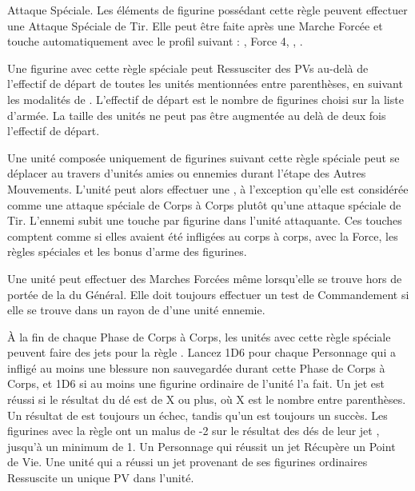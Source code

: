 \armyspecialruleentry{\wailofwoe}

Attaque Spéciale. Les éléments de figurine possédant cette règle peuvent effectuer une Attaque Spéciale de Tir. Elle peut être faite après une Marche Forcée et touche automatiquement avec le profil suivant : , Force 4, \magicalattacks{}, .



Une figurine avec cette règle spéciale peut Ressusciter des PVs au-delà de l'effectif de départ de toutes les unités mentionnées entre parenthèses, en suivant les modalités de \raisewounds{}. L'effectif de départ est le nombre de figurines choisi sur la liste d'armée. La taille des unités ne peut pas être augmentée au delà de deux fois l'effectif de départ.


\armyspecialruleentry{\reaper}

Une unité composée uniquement de figurines suivant cette règle spéciale peut se déplacer au travers d'unités amies ou ennemies durant l'étape des Autres Mouvements. L'unité peut alors effectuer une \sweepingattack{}, à l'exception qu'elle est considérée comme une attaque spéciale de Corps à Corps plutôt qu'une attaque spéciale de Tir. L'ennemi subit une touche par figurine dans l'unité attaquante. Ces touches comptent comme si elles avaient été infligées au corps à corps, avec la Force, les règles spéciales et les bonus d'arme des figurines.


Une unité \vampiric{} peut effectuer des Marches Forcées même lorsqu'elle se trouve hors de portée de la \inspiringpresence{} du Général. Elle doit toujours effectuer un test de Commandement si elle se trouve dans un rayon de  d'une unité ennemie.

À la fin de chaque Phase de Corps à Corps, les unités avec cette règle spéciale peuvent faire des jets pour la règle \vampiric{}. Lancez 1D6 pour chaque Personnage \vampiric{} qui a infligé au moins une blessure non sauvegardée durant cette Phase de Corps à Corps, et 1D6 si au moins une figurine ordinaire \vampiric{} de l'unité l'a fait. Un jet \vampiric{} est réussi si le résultat du dé est de X ou plus, où X est le nombre entre parenthèses. Un résultat de  est toujours un échec, tandis qu'un  est toujours un succès. Les figurines avec la règle \largetarget{} ont un malus de -2 sur le résultat des dés de leur jet \vampiric{}, jusqu'à un minimum de 1. Un Personnage qui réussit un jet \vampiric{} Récupère un Point de Vie. Une unité qui a réussi un jet \vampiric{} provenant de ses figurines ordinaires Ressuscite un unique PV dans l'unité.

